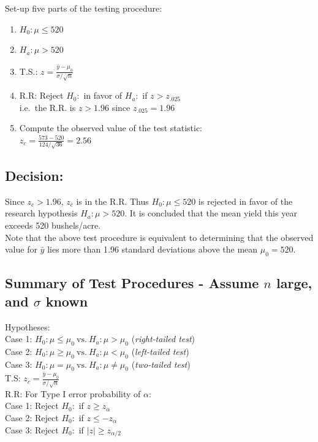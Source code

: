\documentclass[
  letterpaper,
  DIV=11,
  numbers=noendperiod]{scrartcl}
\begin{document}
{Set-up five parts of the testing procedure:}

\begin{enumerate}
\def\labelenumi{\arabic{enumi}.}
\item
  \(H_0: \mu \leq 520\)
\item
  \(H_a: \mu > 520\)
\item
  T.S.: \(z  =  \frac{\bar{y}-\mu_0}{\sigma/\sqrt{n}}\)
\item
  R.R: Reject \(H_0:\) in favor of \(H_a:\) if \(z > z_{.025}\)\\
  i.e.~the R.R. is \(z>1.96\) since \(z_{.025}=1.96\)
\item
  Compute the observed value of the test statistic:\\
  \(z_c =\frac{573-520}{124/{\sqrt{36}}}= 2.56\)
\end{enumerate}

\subsection{Decision:}\label{decision}

Since \(z_c> 1.96\), \(z_c\) is in the R.R. Thus \(H_0:\mu \leq 520\) is
rejected in favor of the research hypothesis \(H_a: \mu > 520\). It is
concluded that the mean yield this year exceeds 520 bushels/acre.\\
Note that the above test procedure is equivalent to determining that the
observed value for \(\bar{y}\) lies more than 1.96 standard deviations
above the mean \(\mu_0=520\).

\subsection{\texorpdfstring{Summary of Test Procedures - Assume \(n\)
large, and \(\sigma\)
known}{Summary of Test Procedures - Assume n large, and \textbackslash sigma known}}\label{summary-of-test-procedures---assume-n-large-and-sigma-known}

{Hypotheses:}\\
{Case 1:} \(H_0: \mu \leq \mu_0\ \mbox{vs.}\ H_a: \mu >\mu_0\)
(\emph{right-tailed test})\\
{Case 2:} \(H_0: \mu \geq \mu_0\ \mbox{vs.}\ H_a: \mu <\mu_0\)
(\emph{left-tailed test})\\
{Case 3:} \(H_0: \mu = \mu_0\ \mbox{vs.}\ H_a: \mu \not =\mu_0\)
(\emph{two-tailed test})\\
{T.S:} \(z_c  =  \frac{\bar{y}-\mu_0}{\sigma/\sqrt{n}}\)\\
{R.R:} For Type I error probability of \(\alpha\):\\
{Case 1:} Reject \(H_0:\) if \(z \geq z_{\alpha}\)\\
{Case 2:} Reject \(H_0:\) if \(z \leq -z_{\alpha}\)\\
{Case 3:} Reject \(H_0:\) if \(|z| \geq  z_{\alpha/2}\)
\end{document}
